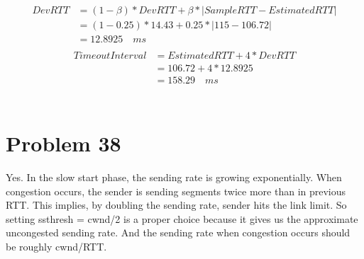 \documentclass[titlepage, paper=a4, fontsize=11pt]{scrartcl} %
\numberwithin{equation}{section} %
\numberwithin{table}{section} %
\begin{document}
\begin{align*} 
\begin{split}
DevRTT &= (1-\beta)*DevRTT + \beta * | SampleRTT - EstimatedRTT | \\
&= (1-0.25)*14.43 + 0.25 * | 115 - 106.72 | \\
&= 12.8925 \quad ms
\end{split}					
\end{align*}
\begin{align*} 
\begin{split}
TimeoutInterval &= EstimatedRTT + 4*DevRTT \\
&= 106.72 + 4*12.8925 \\
&= 158.29 \quad ms
\end{split}					
\end{align*}
\\


\section*{Problem 38}
Yes. In the slow start phase, the sending rate is growing exponentially. When congestion occurs,
the sender is sending segments twice more than in previous RTT. This implies, by doubling the sending
rate, sender hits the link limit. So setting ssthresh = cwnd/2 is a proper choice because it gives us
the approximate uncongested sending rate. And the sending rate when congestion occurs should be
roughly cwnd/RTT.



\end{document}
